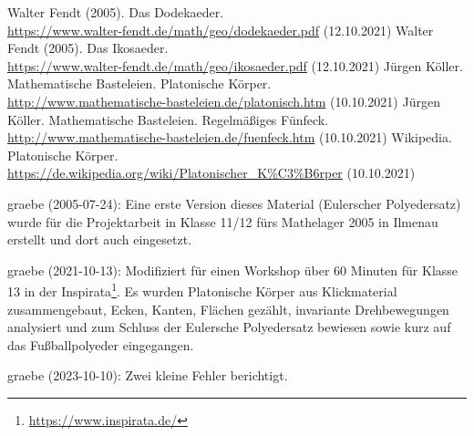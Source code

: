 \documentclass[11pt]{article}
\begin{document}
\begin{thebibliography}{xxx}
 Walter Fendt (2005). Das Dodekaeder.\\
  \url{https://www.walter-fendt.de/math/geo/dodekaeder.pdf} (12.10.2021) 
 Walter Fendt (2005). Das Ikosaeder.\\
  \url{https://www.walter-fendt.de/math/geo/ikosaeder.pdf} (12.10.2021) 
 Jürgen Köller. Mathematische Basteleien.
  Platonische Körper.\\
  \url{http://www.mathematische-basteleien.de/platonisch.htm} (10.10.2021)
 Jürgen Köller. Mathematische Basteleien.
  Regelmäßiges Fünfeck.\\
  \url{http://www.mathematische-basteleien.de/fuenfeck.htm} (10.10.2021)
 Wikipedia. Platonische Körper.\\ 
  \url{https://de.wikipedia.org/wiki/Platonischer_K%C3%B6rper} (10.10.2021)
\end{thebibliography}

\begin{attribution}
graebe (2005-07-24): Eine erste Version dieses Material (Eulerscher
Polyedersatz) wurde für die Projektarbeit in Klasse 11/12 fürs Mathelager 2005
in Ilmenau erstellt und dort auch eingesetzt.

graebe (2021-10-13): Modifiziert für einen Workshop über 60 Minuten für Klasse
13 in der Inspirata\footnote{\url{https://www.inspirata.de/}}.  Es wurden
Platonische Körper aus Klickmaterial zusammengebaut, Ecken, Kanten, Flächen
gezählt, invariante Drehbewegungen analysiert und zum Schluss der Eulersche
Polyedersatz bewiesen sowie kurz auf das Fußballpolyeder eingegangen.

graebe (2023-10-10): Zwei kleine Fehler berichtigt.
\end{attribution}
\end{document}
